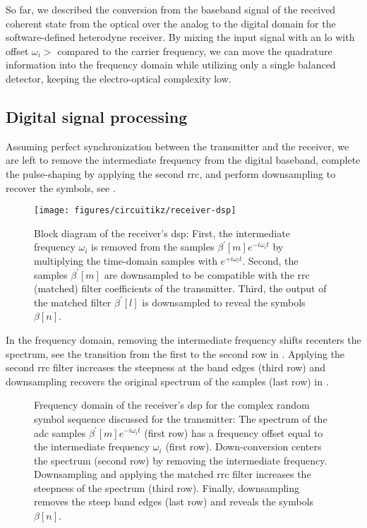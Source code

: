 So far, we described the conversion from the baseband signal of the received coherent state from the optical over the analog to the digital domain for the software-defined heterodyne receiver.
By mixing the input signal with an \gls{lo} with offset $\omega_i>$ compared to the carrier frequency, we can move the quadrature information into the frequency domain while utilizing only a single balanced detector, keeping the electro-optical complexity low.

\FloatBarrier
\subsection{Digital signal processing}

Assuming perfect synchronization between the transmitter and the receiver, we are left to remove the intermediate frequency from the digital baseband, complete the pulse-shaping by applying the second \gls{rrc}, and perform downsampling to recover the symbols, see .
\begin{figure}[htb]
	\centering
	\texttt{[image: figures/circuitikz/receiver-dsp]}
	\caption{Block diagram of the receiver's \gls{dsp}: First, the intermediate frequency $\omega_i$ is removed from the samples $\beta^\prime[m]e^{-i\omega_it}$ by multiplying the time-domain samples with $e^{+i\omega_lt}$. Second, the samples $\beta^\prime[m]$ are downsampled to be compatible with the \gls{rrc} (matched) filter coefficients of the transmitter. Third, the output of the matched filter $\beta^\prime[l]$ is downsampled to reveal the symbols $\beta[n]$.}\label{fig:receiver_dsp}
\end{figure}
In the frequency domain, removing the intermediate frequency shifts recenters the spectrum, see the transition from the first to the second row in .
Applying the second \gls{rrc} filter increases the steepness at the band edges (third row) and downsampling recovers the original spectrum of the samples (last row) in .
\begin{figure}[htb]
	\centering
	
	\caption{Frequency domain of the receiver's \gls{dsp} for the complex random symbol sequence discussed for the transmitter: The spectrum of the \gls{adc} samples $\beta^\prime[m]e^{-i\omega_it}$ (first row) has a frequency offset equal to the intermediate frequency $\omega_i$ (first row). Down-conversion centers the spectrum (second row) by removing the intermediate frequency. Downsampling and applying the matched \gls{rrc} filter increases the steepness of the spectrum (third row). Finally, downsampling removes the steep band edges (last row) and reveals the symbols $\beta[n]$.}\label{fig:receiver_frequency}
\end{figure}
